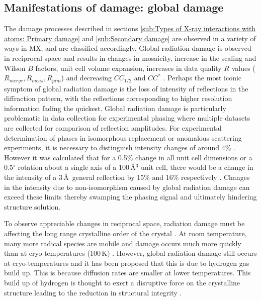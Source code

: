     \subsection{Manifestations of damage: global damage}
    \label{sub:Manifestations of damage: Global damage}
        The damage processes described in sections \ref{sub:Types of X-ray interactions with atoms: Primary damage} and \ref{sub:Secondary damage} are observed in a variety of ways in MX, and are classified accordingly.
        Global radiation damage is observed in reciprocal space and results in changes in mosaicity, increase in the scaling and Wilson $B$ factors, unit cell volume expansion, increases in data quality $R$ values ($R_{merge}, R_{meas}, R_{pim}$) and decreasing $CC_{1/2}$ and $CC^*$ \cite{garman2010}.
        Perhaps the most iconic symptom of global radiation damage is the loss of intensity of reflections in the diffraction pattern, with the reflections corresponding to higher resolution information fading the quickest.
        Global radiation damage is particularly problematic in data collection for experimental phasing where multiple datasets are collected for comparison of reflection amplitudes.
        For experimental determination of phases in isomorphous replacement or anomalous scattering experiments, it is necessary to distinguish intensity changes of around 4\% \cite{taylor2010}.
        However it was calculated that for a 0.5\% change in all unit cell dimensions or a 0.5$^{\circ}$ rotation about a single axis of a 100\,\AA$^3$ unit cell, there would be a change in the intensity of a 3\,\AA\ general reflection by 15\% and 16\% respectively \cite{crick1956}.
        Changes in the intensity due to non-isomorphism caused by global radiation damage can exceed these limits thereby swamping the phasing signal and ultimately hindering structure solution.

        To observe appreciable changes in reciprocal space, radiation damage must be affecting the long range crystalline order of the crystal \cite{meents2010}.
        At room temperature, many more radical species are mobile and damage occurs much more quickly than at cryo-temperatures (100\,K) \cite{henderson1990cryo,weik2010temperature}.
        However, global radiation damage still occurs at cryo-temperatures and it has been proposed that this is due to hydrogen gas build up.
		This is because diffusion rates are smaller at lower temperatures.
		This build up of hydrogen is thought to exert a disruptive force on the crystalline structure leading to the reduction in structural integrity \cite{meents2010}.

